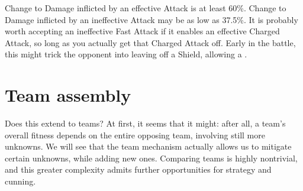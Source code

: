 Change to Damage inflicted by an effective Attack is at least 60\%.
Change to Damage inflicted by an ineffective Attack may be as
 low as 37.5\%.
It is probably worth accepting an ineffective Fast Attack if it
 enables an effective Charged Attack, so long as you actually
 get that Charged Attack off.
Early in the battle, this might trick the opponent into leaving
 off a Shield, allowing a .

\section{Team assembly}
Does this extend to teams?
At first, it seems that it might: after all, a team's overall fitness
 depends on the entire opposing team, involving still more unknowns.
We will see that the team mechanism actually allows us to mitigate certain
 unknowns, while adding new ones.
Comparing teams is highly nontrivial, and this greater complexity admits
 further opportunities for strategy and cunning.
